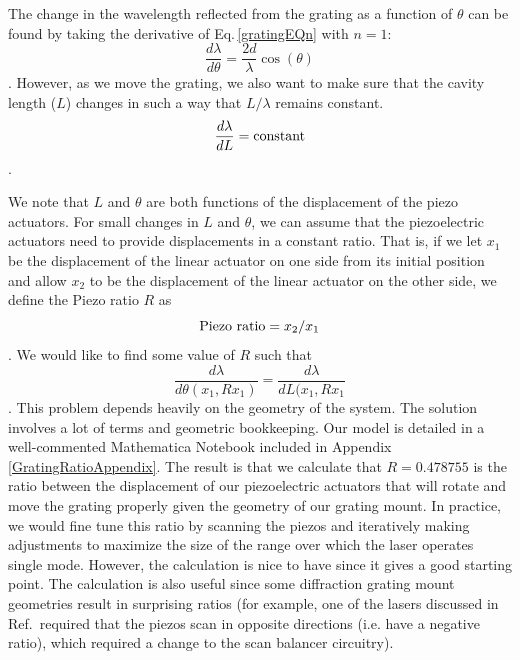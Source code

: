 The change in the wavelength reflected from the grating as a function of $\theta$ can be found by taking the derivative of Eq.\,\ref{gratingEQn} with $n=1$:
\begin{equation}
    \frac{d\lambda}{d \theta}= \frac{2d}{\lambda} \cos(\theta)
\end{equation}.
However, as we move the grating, we also want to make sure that the cavity length ($L$) changes in such a way that $L/\lambda$ remains constant. 
\begin{equation}
    \frac{d \lambda}{d L}= \textnormal{constant} 
\end{equation}.

We note that $L$ and $\theta$ are both functions of the displacement of the piezo actuators. For small changes in $L$ and $\theta$, we can assume that the piezoelectric actuators need to provide displacements in a constant ratio. That is, if we let $x_1$ be the displacement of the linear actuator on one side from its initial position and allow $x_2$ to be the displacement of the linear actuator on the other side, we define the Piezo ratio $R$ as 
\begin{equation}
\textnormal{Piezo ratio}=x_2/x_1
\end{equation}.
We would like to find some value of $R$ such that
\begin{equation}
    \frac{d\lambda}{d \theta(x_1,R x_1)}= \frac{d \lambda}{d L(x_1,R x_1}
\end{equation}.
This problem depends heavily on the geometry of the system. The solution involves a lot of terms and geometric bookkeeping. Our model is detailed in a well-commented Mathematica Notebook included in Appendix\,\ref{GratingRatioAppendix}. The result is that we calculate that $R=0.478755$ is the ratio between the displacement of our piezoelectric actuators that will rotate and move the grating properly given the geometry of our grating mount. In practice, we would fine tune this ratio by scanning the piezos and iteratively making adjustments to maximize the size of the range over which the laser operates single mode. However, the calculation is nice to have since it gives a good starting point. The calculation is also useful since some diffraction grating mount geometries result in surprising ratios (for example, one of the lasers discussed in Ref.\,\cite{cjeDiss} required that the piezos scan in opposite directions (i.e. have a negative ratio), which required a change to the scan balancer circuitry).



